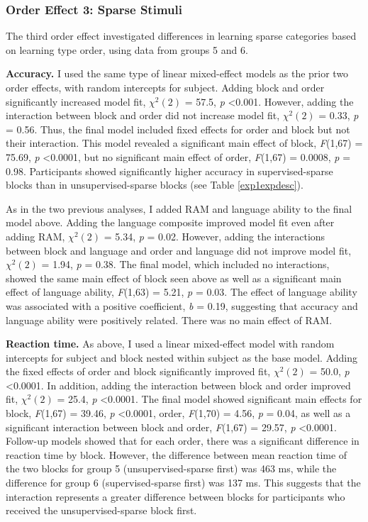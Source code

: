 \documentclass[../dissertation.tex]{subfiles}
\begin{document}
\subsubsection{Order Effect 3: Sparse Stimuli}
	The third order effect investigated differences in learning sparse categories based on learning type order, using data from groups 5 and 6. \par 
	\textbf{Accuracy.} I used the same type of linear mixed-effect models as the prior two order effects, with random intercepts for subject. Adding block and order significantly increased model fit, $\chi^{2}(2)$ = 57.5, \textit{p} \textless 0.001. However, adding the interaction between block and order did not increase model fit, $\chi^{2}(2)$ = 0.33, \textit{p} = 0.56. Thus, the final model included fixed effects for order and block but not their interaction. This model revealed a significant main effect of block, \textit{F}(1,67) = 75.69, \textit{p} \textless 0.0001, but no significant main effect of order, \textit{F}(1,67) = 0.0008, \textit{p} = 0.98. Participants showed significantly higher accuracy in supervised-sparse blocks than in unsupervised-sparse blocks (see Table \ref{exp1expdesc}). \par 
	As in the two previous analyses, I added RAM and language ability to the final model above. Adding the language composite improved model fit even after adding RAM, $\chi^{2}(2)$ = 5.34, \textit{p} = 0.02. However, adding the interactions between block and language and order and language did not improve model fit, $\chi^{2}(2)$ = 1.94, \textit{p} = 0.38. The final model, which included no interactions, showed the same main effect of block seen above as well as a significant main effect of language ability, \textit{F}(1,63) = 5.21, \textit{p} = 0.03. The effect of language ability was associated with a positive coefficient, \textit{b} = 0.19, suggesting that accuracy and language ability were positively related. There was no main effect of RAM. \par 
	\textbf{Reaction time.} As above, I used a linear mixed-effect model with random intercepts for subject and block nested within subject as the base model. Adding the fixed effects of order and block significantly improved fit, $\chi^{2}(2)$ = 50.0, \textit{p} \textless 0.0001. In addition, adding the interaction between block and order improved fit,  $\chi^{2}(2)$ = 25.4, \textit{p} \textless 0.0001. The final model showed significant main effects for block, \textit{F}(1,67) = 39.46, \textit{p} \textless 0.0001, order, \textit{F}(1,70) = 4.56, \textit{p} = 0.04, as well as a significant interaction between block and order, \textit{F}(1,67) = 29.57, \textit{p} \textless 0.0001. Follow-up models showed that for each order, there was a significant difference in reaction time by block. However, the difference between mean reaction time of the two blocks for group 5 (unsupervised-sparse first) was 463 ms, while the difference for group 6 (supervised-sparse first) was 137 ms. This suggests that the interaction represents a greater difference between blocks for participants who received the unsupervised-sparse block first.  \par 
\end{document}
